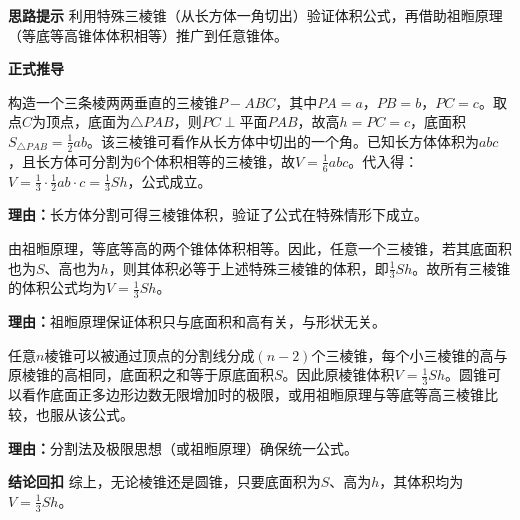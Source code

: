 \begin{proofbox}
	\textbf{\textcolor{CProof}{思路提示}}
	利用特殊三棱锥（从长方体一角切出）验证体积公式，再借助祖暅原理（等底等高锥体体积相等）推广到任意锥体。

	\medskip
	\textbf{\textcolor{CProof}{正式推导}}
	\begin{description}[style=nextline, leftmargin=2.8em, labelsep=0.5em, itemsep=0.55em]
		\item[\textbf{步骤一（特殊三棱锥）：}]
			构造一个三条棱两两垂直的三棱锥$P-ABC$，其中$PA=a$，$PB=b$，$PC=c$。取点$C$为顶点，底面为$\triangle PAB$，则$PC\perp$平面$PAB$，故高$h=PC=c$，底面积$S_{\triangle PAB}=\frac{1}{2}ab$。该三棱锥可看作从长方体中切出的一个角。已知长方体体积为$abc$，且长方体可分割为$6$个体积相等的三棱锥，故$V=\frac{1}{6}abc$。代入得：$V=\frac{1}{3}\cdot\frac{1}{2}ab\cdot c=\frac{1}{3}Sh$，公式成立。
			\par\textbf{理由：}长方体分割可得三棱锥体积，验证了公式在特殊情形下成立。
		\item[\textbf{步骤二（等积推广）：}]
			由祖暅原理，等底等高的两个锥体体积相等。因此，任意一个三棱锥，若其底面积也为$S$、高也为$h$，则其体积必等于上述特殊三棱锥的体积，即$\frac{1}{3}Sh$。故所有三棱锥的体积公式均为$V=\frac{1}{3}Sh$。
			\par\textbf{理由：}祖暅原理保证体积只与底面积和高有关，与形状无关。
		\item[\textbf{步骤三（任意锥体）：}]
			任意$n$棱锥可以被通过顶点的分割线分成$(n-2)$个三棱锥，每个小三棱锥的高与原棱锥的高相同，底面积之和等于原底面积$S$。因此原棱锥体积$V=\frac{1}{3}Sh$。圆锥可以看作底面正多边形边数无限增加时的极限，或用祖暅原理与等底等高三棱锥比较，也服从该公式。
			\par\textbf{理由：}分割法及极限思想（或祖暅原理）确保统一公式。
	\end{description}

	\medskip
	\textbf{\textcolor{CProof}{结论回扣}}
	综上，无论棱锥还是圆锥，只要底面积为$S$、高为$h$，其体积均为$V=\frac{1}{3}Sh$。
\end{proofbox}
